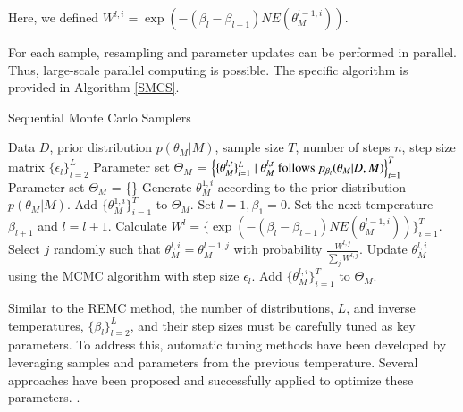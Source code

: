 \documentclass[12pt]{article}
\begin{document}
Here, we defined $W^{l,i} = \exp(-(\beta_{l} - \beta_{l-1})NE(\theta_M^{l-1,i}))$. \par
For each sample, resampling and parameter updates can be performed in parallel. Thus, large-scale parallel computing is possible. The specific algorithm is provided in Algorithm \ref{SMCS}. \par
\begin{algorithm}[h]
\caption{Sequential Monte Carlo Samplers}
\label{SMCS}
\begin{algorithmic}[1]
    \REQUIRE Data $D$, prior distribution $p(\theta_M|M)$, sample size $T$, number of steps $n$, step size matrix $\{\epsilon_l\}_{l = 2}^L$
    \ENSURE Parameter set $\Theta_M$ = $\left\{\{\theta_M^{l,t}\}_{l = 1}^L \mid \theta_M^{l,t} \textup{ follows } p_{\beta_l}(\theta_M|D,M)\right\}_{t = 1}^{T}$
    \STATE Parameter set $\Theta_M$ = \{\}
        \STATE Generate $\theta_M^{1,i}$ according to the prior distribution $p(\theta_M|M)$.
    \ENDFOR
    \STATE Add $\{\theta_M^{1,i}\}_{i=1}^T$ to $\Theta_M$.
    \STATE Set $l = 1, \beta_1 = 0$.
        \STATE Set the next temperature $\beta_{l+1}$ and $l = l + 1$.
        \STATE Calculate $W^l = \{ \exp(-(\beta_{l} - \beta_{l-1})NE(\theta_M^{l-1,i}))\}_{i=1}^T$.
            \STATE Select $j$ randomly such that $\theta_M^{l,i} = \theta_M^{l-1,j}$ with probability $\frac{W^{l,j}}{\sum_j W^{l,j}}$.
        \ENDFOR
                \STATE Update $\theta_M^{l,i}$ using the MCMC algorithm with step size $\epsilon_l$.
            \ENDFOR
        \ENDFOR
        \STATE Add $\{\theta_M^{l,i}\}_{i=1}^T$ to $\Theta_M$.
    \ENDWHILE
\end{algorithmic}
\end{algorithm}


Similar to the REMC method, the number of distributions, $L$, and inverse temperatures, $\{\beta_l\}_{l=2}^L$, and their step sizes must be carefully tuned as key parameters.
To address this, automatic tuning methods have been developed by leveraging samples and parameters from the previous temperature. 
Several approaches have been proposed and successfully applied to optimize these parameters. \cite{del2006sequential, ching2007transitional, fearnhead2013adaptive,schafer2013sequential,beskos2016convergence}.
\end{document}
